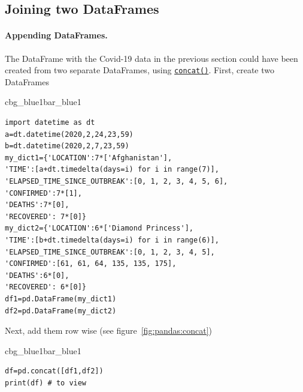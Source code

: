 \documentclass[%
oneside,                 %
final,                   %
10pt]{article}
\newenvironment{_pro_tight}[2]{
   \def\FrameCommand{\color{#2}\vrule width 1mm\normalcolor\colorbox{#1}}
   \FrameRule0.6pt\MakeFramed {\advance\hsize-2mm\FrameRestore}\vskip3mm}
   {\vskip0mm\endMakeFramed}
\newenvironment{pro}[2]{
\bgroup\rmfamily
\fboxsep=0mm\relax
\begin{_pro_tight}{#1}{#2}
\list{}{\parsep=-2mm\parskip=0mm\topsep=0pt\leftmargin=2mm
\rightmargin=2\leftmargin\leftmargin=4pt\relax}
\item\relax}
{\endlist\end{_pro_tight}\egroup}
\begin{document}
\subsection{Joining two DataFrames}
\paragraph{Appending DataFrames.}
The DataFrame with the Covid-19 data in the previous section could have been created from two separate DataFrames, using \href{{https://pandas.pydata.org/docs/reference/api/pandas.concat.html}}{\nolinkurl{concat()}}. First, create two DataFrames 


















\begin{pro}{cbg_blue1}{bar_blue1}\begin{Verbatim}[numbers=none,fontsize=\fontsize{9pt}{9pt},baselinestretch=0.95,xleftmargin=2mm]
import datetime as dt
a=dt.datetime(2020,2,24,23,59)
b=dt.datetime(2020,2,7,23,59)
my_dict1={'LOCATION':7*['Afghanistan'], 
'TIME':[a+dt.timedelta(days=i) for i in range(7)],
'ELAPSED_TIME_SINCE_OUTBREAK':[0, 1, 2, 3, 4, 5, 6],
'CONFIRMED':7*[1],
'DEATHS':7*[0],
'RECOVERED': 7*[0]}
my_dict2={'LOCATION':6*['Diamond Princess'], 
'TIME':[b+dt.timedelta(days=i) for i in range(6)],
'ELAPSED_TIME_SINCE_OUTBREAK':[0, 1, 2, 3, 4, 5],
'CONFIRMED':[61, 61, 64, 135, 135, 175],
'DEATHS':6*[0],
'RECOVERED': 6*[0]}
df1=pd.DataFrame(my_dict1)
df2=pd.DataFrame(my_dict2)

\end{Verbatim}
\end{pro}
\noindent

Next, add them row wise (see figure~\ref{fig:pandas:concat})




\begin{pro}{cbg_blue1}{bar_blue1}\begin{Verbatim}[numbers=none,fontsize=\fontsize{9pt}{9pt},baselinestretch=0.95,xleftmargin=2mm]
df=pd.concat([df1,df2])
print(df) # to view

\end{Verbatim}
\end{pro}
\noindent
\end{document}
